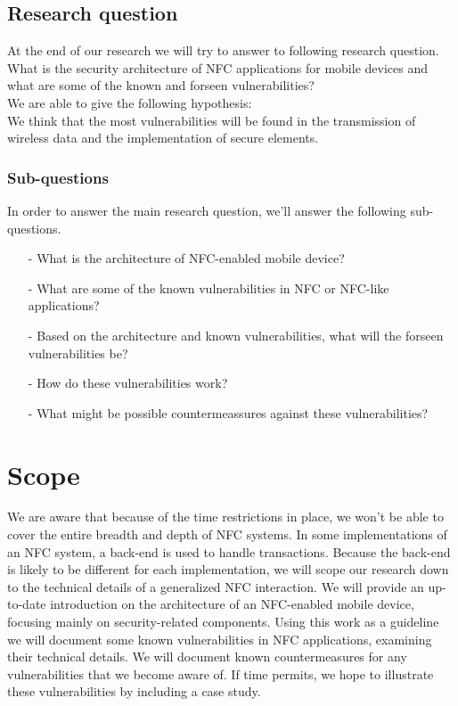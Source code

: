 \documentclass[11pt]{article} %
\begin{document}
\newpage
\subsection{Research question}

At the end of our research we will try to answer to following research question. 
\\

\noindent What is the security architecture of NFC applications for mobile devices and what are some of the known and forseen vulnerabilities? %
\\

\noindent We are able to give the following hypothesis:
\\

\noindent We think that the most vulnerabilities will be found in the transmission of wireless data and the implementation of secure elements. %

\subsubsection{Sub-questions}

In order to answer the main research question, we'll answer the following sub-questions.

\begin{itemize}
\item [-] What is the architecture of NFC-enabled mobile device?

\item [-] What are some of the known vulnerabilities in NFC or NFC-like applications?

\item [-] Based on the architecture and known vulnerabilities, what will the forseen vulnerabilities be?

\item [-] How do these vulnerabilities work?

\item [-] What might be possible countermeassures against these vulnerabilities?

\end{itemize}

\section{Scope}
We are aware that because of the time restrictions in place, we won't be able to cover the entire breadth and depth of NFC systems.
In some implementations of an NFC system, a back-end is used to handle transactions.
Because the back-end is likely to be different for each implementation, we will scope our research down to the technical details of a generalized NFC interaction.
We will provide an up-to-date introduction on the architecture of an NFC-enabled mobile device, focusing mainly on security-related components.
Using this work as a guideline we will document some known vulnerabilities in NFC applications, examining their technical details.
We will document known countermeasures for any vulnerabilities that we become aware of.
If time permits, we hope to illustrate these vulnerabilities by including a case study.
\end{document}
